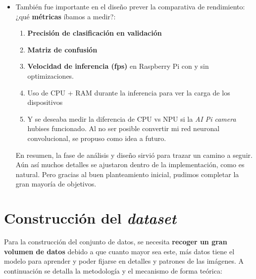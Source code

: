 \begin{itemize}
    \item También fue importante en el diseño prever la comparativa de rendimiento: ¿qué \textbf{métricas} íbamos a medir?:
    
        \begin{enumerate}
    
            \item \textbf{Precisión de clasificación en validación}
            \item \textbf{Matriz de confusión}
            \item \textbf{Velocidad de inferencia (fps)} en Raspberry Pi con y sin optimizaciones.
            \item Uso de CPU + RAM durante la inferencia para ver la carga de los dispositivos
            \item Y se deseaba medir la diferencia de CPU vs NPU si la \textit{AI Pi camera} hubises funcionado. Al no ser posible convertir mi red neuronal convolucional, se propuso como idea a futuro.
        \end{enumerate}

En resumen, la fase de análisis y diseño sirvió para trazar un camino a seguir. Aún así muchos detalles se ajustaron dentro de la implementación, como es natural. Pero gracias al buen planteamiento inicial, pudimos completar la gran mayoría de objetivos.
    
\end{itemize}

\section{Construcción del \textit{dataset}}
Para la construcción del conjunto de datos, se necesita \textbf{recoger un gran volumen de datos} debido a que cuanto mayor sea este, más datos tiene el modelo para aprender y poder fijarse en detalles y patrones de las imágenes. A continuación se detalla la metodología y el mecanismo de forma teórica:

